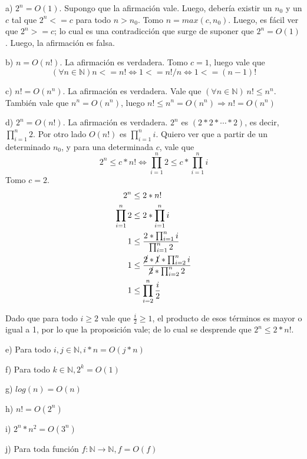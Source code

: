 \documentclass[11pt, spanish]{article}
\begin{document}
a) $2^n = O(1)$. Supongo que la afirmación vale. Luego, debería existir un $n_0$ y un $c$ tal que $2^n <= c$ para todo $n>n_0$. Tomo $n=max(c,n_0)$. Luego, es fácil ver que $2^{n} >= c$; lo cual es una contradicción que surge de suponer que $2^n = O(1)$. Luego, la afirmación es falsa.

\vspace{1em}
b) $n = O(n!)$.
La afirmación es verdadera. Tomo $c=1$, luego vale que 
\[
(\forall n \in \mathbb{N}) n <= n! \iff 1 <= n!/n \iff 1 <= (n-1)!
\]

\vspace{1em}
c) $n! = O(n^n)$.
La afirmación es verdadera. Vale que $(\forall n \in \mathbb{N})\ n! \leq n^n$. También vale que $n^n = O(n^n)$, luego $n! \leq n^n = O(n^n) \Rightarrow n! = O(n^n)$

\vspace{1em}
d) $2^n = O(n!)$. La afirmación es verdadera. $2^n$ es $(2 * 2 * \cdots * 2)$, es decir, $\prod_{i=1}^{n}2$. Por otro lado $O(n!)$ es $\prod_{i=1}^{n}i$. Quiero ver que a partir de un determinado $n_0$, y para una determinada $c$, vale que \[
2^n \leq c*n! \iff \prod_{i=1}^{n}2 \leq c*\prod_{i=1}^{n}i
\]
Tomo $c=2$.
\begin{equation*}\begin{split}
2^n &\leq 2*n!\\
\prod_{i=1}^{n}2 &\leq 2*\prod_{i=1}^{n}i\\
1 &\leq \frac{2*\prod_{i=1}^{n}i}{\prod_{i=1}^{n}2}\\
1 &\leq \frac{\cancel{2}*\cancel{1}*\prod_{i=2}^{n}i}{\cancel{2}* \prod_{i=2}^{n}2}\\
1 &\leq \prod_{i=2}^{n}{\frac{i}{2}}\\
\end{split}\end{equation*}

Dado que para todo $i\geq2$ vale que $\frac{i}{2}\geq1$, el producto de esos términos es mayor o igual a 1, por lo que la proposición vale; de lo cual se desprende que $2^n \leq 2*n!$.

\vspace{1em}
e) Para todo $i,j \in \mathbb{N}, i*n = O(j*n)$

\vspace{1em}
f) Para todo $k \in \mathbb{N}, 2^k = O(1)$

\vspace{1em}
g) $log(n) = O(n)$

\vspace{1em}
h) $n! = O(2^n)$

\vspace{1em}
i) $2^n*n^2 = O(3^n)$

\vspace{1em}
j) Para toda función $f: \mathbb{N} \to \mathbb{N}, f=O(f)$
\end{document}
